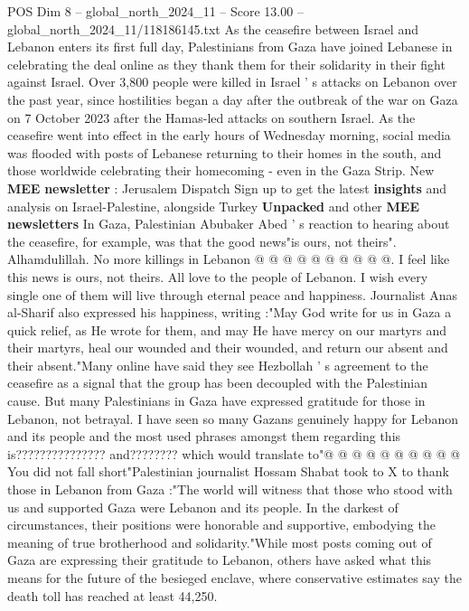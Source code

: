 \begin{textsample}{POS Dim 8 – global\_north\_2024\_11 – Score 13.00 – global\_north\_2024\_11/118186145.txt}  \label{ex:f8_pos_060}
As the ceasefire between Israel and Lebanon enters its first full day, Palestinians from Gaza have joined Lebanese in celebrating the deal online as they thank them for their solidarity in their fight against Israel.
Over 3,800 people were killed in Israel ' s attacks on Lebanon over the past year, since hostilities began a day after the outbreak of the war on Gaza on 7 October 2023 after the Hamas-led attacks on southern Israel.
As the ceasefire went into effect in the early hours of Wednesday morning, social media was flooded with posts of Lebanese returning to their homes in the south, and those worldwide celebrating their homecoming - even in the Gaza Strip.
New \textbf{MEE} \textbf{newsletter} : Jerusalem Dispatch Sign up to get the latest \textbf{insights} and analysis on Israel-Palestine, alongside Turkey \textbf{Unpacked} and other \textbf{MEE} \textbf{newsletters} In Gaza, Palestinian Abubaker Abed ' s reaction to hearing about the ceasefire, for example, was that the good news"is ours, not theirs".
Alhamdulillah.
No more killings in Lebanon @ @ @ @ @ @ @ @ @ @.
I feel like this news is ours, not theirs.
All love to the people of Lebanon.
I wish every single one of them will live through eternal peace and happiness.
Journalist Anas al-Sharif also expressed his happiness, writing :"May God write for us in Gaza a quick relief, as He wrote for them, and may He have mercy on our martyrs and their martyrs, heal our wounded and their wounded, and return our absent and their absent."Many online have said they see Hezbollah ' s agreement to the ceasefire as a signal that the group has been decoupled with the Palestinian cause.
But many Palestinians in Gaza have expressed gratitude for those in Lebanon, not betrayal.
I have seen so many Gazans genuinely happy for Lebanon and its people and the most used phrases amongst them regarding this is??????????????? and???????? which would translate to"@ @ @ @ @ @ @ @ @ @ You did not fall short"Palestinian journalist Hossam Shabat took to X to thank those in Lebanon from Gaza :"The world will witness that those who stood with us and supported Gaza were Lebanon and its people.
In the darkest of circumstances, their positions were honorable and supportive, embodying the meaning of true brotherhood and solidarity."While most posts coming out of Gaza are expressing their gratitude to Lebanon, others have asked what this means for the future of the besieged enclave, where conservative estimates say the death toll has reached at least 44,250.

\end{textsample}
